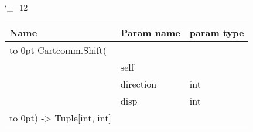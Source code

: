 \begingroup \catcode`\_=12 \tt
\begin{tabular}{lll}
\toprule
\textrm{Name}&\textrm{Param name}&\textrm{param type}\\
\midrule
\hbox to 0pt {Cartcomm.Shift(\hss}\\
& self\\
& direction & int\\
& disp & int\\
\hbox to 0pt{) -> Tuple[int, int]\hss}\\
\bottomrule
\end{tabular}
\endgroup
